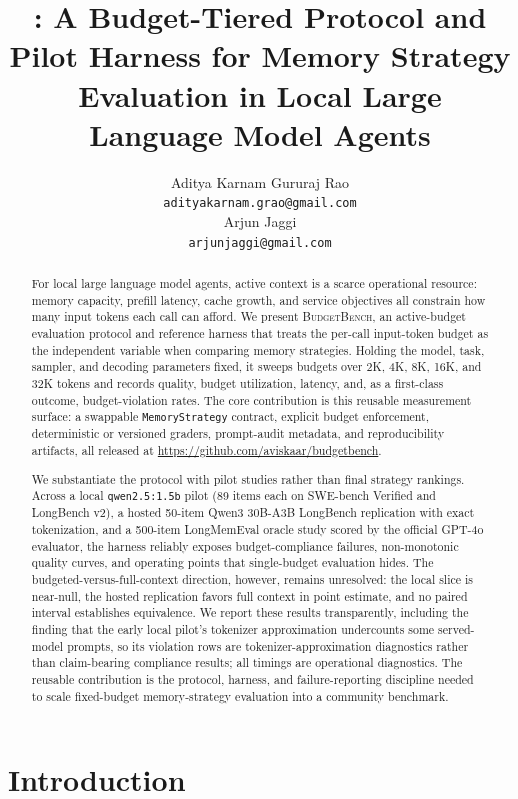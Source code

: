 \documentclass[11pt]{article}
\title{\BudgetBench: A Budget-Tiered Protocol and Pilot Harness for Memory Strategy Evaluation in Local Large Language Model Agents}
\author{%
  Aditya Karnam Gururaj Rao\\
  \texttt{adityakarnam.grao@gmail.com}\\[0.6em]
  Arjun Jaggi\\
  \texttt{arjunjaggi@gmail.com}\\
}
\date{}
\newcommand{\BudgetBench}{\textsc{BudgetBench}}
\newcommand{\RunModel}{\texttt{qwen2.5:1.5b}}
\newcommand{\RepoURL}{\url{https://github.com/aviskaar/budgetbench}}
\begin{document}
\maketitle

\begin{abstract}
For local large language model agents, active context is a scarce operational
resource: memory capacity, prefill latency, cache growth, and service
objectives all constrain how many input tokens each call can afford.  We
present \BudgetBench{}, an active-budget evaluation protocol and reference
harness that treats the per-call input-token budget as the independent variable
when comparing memory strategies.  Holding the model, task, sampler, and
decoding parameters fixed, it sweeps budgets over 2K, 4K, 8K, 16K, and 32K
tokens and records quality, budget utilization, latency, and, as a first-class
outcome, budget-violation rates.  The core contribution is this reusable
measurement surface: a swappable \texttt{MemoryStrategy} contract, explicit
budget enforcement, deterministic or versioned graders, prompt-audit metadata,
and reproducibility artifacts, all released at \RepoURL{}.

We substantiate the protocol with pilot studies rather than final strategy
rankings.  Across a local \RunModel{} pilot (89 items each on SWE-bench
Verified and LongBench v2), a hosted 50-item Qwen3 30B-A3B LongBench
replication with exact tokenization, and a 500-item LongMemEval oracle study
scored by the official GPT-4o evaluator, the harness reliably exposes
budget-compliance failures, non-monotonic quality curves, and operating points
that single-budget evaluation hides.  The budgeted-versus-full-context
direction, however, remains unresolved: the local slice is near-null, the
hosted replication favors full context in point estimate, and no paired
interval establishes equivalence.  We report these results transparently,
including the finding that the early local pilot's tokenizer approximation
undercounts some served-model prompts, so its violation rows are
tokenizer-approximation diagnostics rather than claim-bearing compliance
results; all timings are operational diagnostics.  The reusable contribution is
the protocol, harness, and failure-reporting discipline needed to scale
fixed-budget memory-strategy evaluation into a community benchmark.
\end{abstract}

\section{Introduction}
\end{document}
